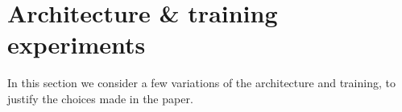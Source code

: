 
\section{Architecture \& training experiments} \label{app_lesion_results}
In this section we consider a few variations of the architecture and training, to justify the choices made in the paper. \par

